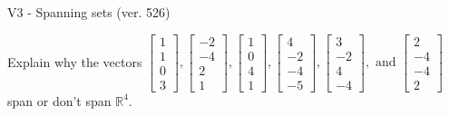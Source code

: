 \begin{exercise}
  \begin{exerciseTitle}V3 - Spanning sets (ver. 526)\end{exerciseTitle}
  \begin{exerciseStatement}
    Explain why the vectors \(\left[\begin{array}{r}
1 \\
1 \\
0 \\
3
\end{array}\right] , \left[\begin{array}{r}
-2 \\
-4 \\
2 \\
1
\end{array}\right] , \left[\begin{array}{r}
1 \\
0 \\
4 \\
1
\end{array}\right] , \left[\begin{array}{r}
4 \\
-2 \\
-4 \\
-5
\end{array}\right] , \left[\begin{array}{r}
3 \\
-2 \\
4 \\
-4
\end{array}\right] , \text{ and } \left[\begin{array}{r}
2 \\
-4 \\
-4 \\
2
\end{array}\right]\) span or don't span \(\mathbb{R}^4\). 
	



\end{exerciseStatement}
\end{exercise}
